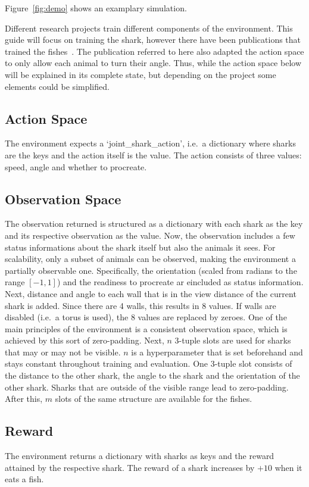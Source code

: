 \documentclass[12pt, letterpaper, fleqn, notitlepage]{article}
\begin{document}
Figure~\ref{fig:demo} shows an examplary simulation.

Different research projects train different components of the environment. This
guide will focus on training the shark, however there have been publications
that trained the fishes~\cite{HPGBL19}. The publication referred to here also
adapted the action space to only allow each animal to turn their angle. Thus,
while the action space below will be explained in its complete state, but
depending on the project some elements could be simplified.

\subsection{Action Space}

The environment expects a `joint\_shark\_action', i.e.\ a dictionary where
sharks are the keys and the action itself is the value. The action consists of
three values: speed, angle and whether to procreate.

\subsection{Observation Space}

The observation returned is structured as a dictionary with each shark as the
key and its respective observation as the value. Now, the observation includes
a few status informations about the shark itself but also the animals it sees.
For scalability, only a subset of animals can be observed, making the
environment a partially observable one. Specifically, the orientation (scaled
from radians to the range $[-1, 1]$) and the readiness to procreate ar
eincluded as status information. Next, distance and angle to each wall that is
in the view distance of the current shark is added. Since there are 4 walls,
this results in 8 values. If walls are disabled (i.e.\ a torus is used), the 8
values are replaced by zeroes. One of the main principles of the environment is
a consistent observation space, which is achieved by this sort of zero-padding.
Next, $n$ 3-tuple slots are used for sharks that may or may not be visible. $n$
is a hyperparameter that is set beforehand and stays constant throughout
training and evaluation. One 3-tuple slot consists of the distance to the other
shark, the angle to the shark and the orientation of the other shark. Sharks
that are outside of the visible range lead to zero-padding. After this, $m$
slots of the same structure are available for the fishes.

\subsection{Reward}
The environment returns a dictionary with sharks as keys and the reward
attained by the respective shark. The reward of a shark increases by $+10$ when
it eats a fish.





\end{document}
